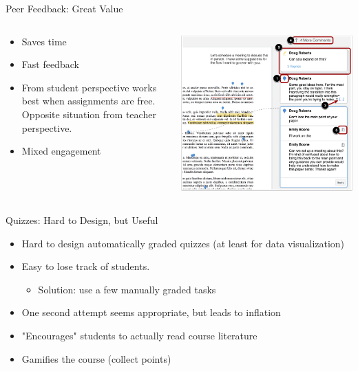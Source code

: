 \begin{frame}{Peer Feedback: Great Value}
  \begin{columns}[c,onlytextwidth]
    \begin{column}{0.6\linewidth}
      \begin{itemize}
        \item Saves time
        \item Fast feedback
        \item From student perspective works best when assignments are free.
              Opposite situation from teacher perspective.
        \item Mixed engagement
      \end{itemize}
    \end{column}
    \begin{column}{0.4\linewidth}
      \includegraphics[width=\linewidth]{figures/peer-reviews.png}
    \end{column}
  \end{columns}
\end{frame}

\begin{frame}{Quizzes: Hard to Design, but Useful}
  \begin{itemize}
    \item Hard to design automatically graded quizzes (at least for data
          visualization)
    \item Easy to lose track of students.
          \begin{itemize}
            \item Solution: use a few manually graded tasks
          \end{itemize}
    \item One second attempt seems appropriate, but leads to inflation
    \item "Encourages" students to actually read course literature
    \item Gamifies the course (collect points)
  \end{itemize}
\end{frame}

